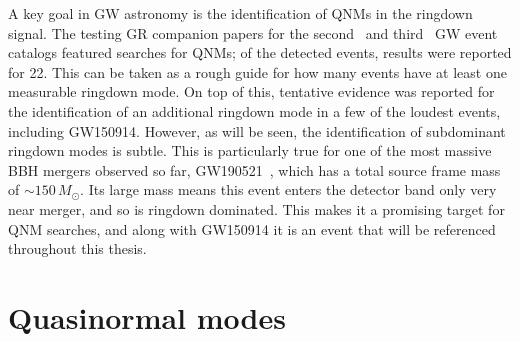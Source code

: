 A key goal in GW astronomy is the identification of QNMs in the ringdown signal.
The testing GR companion papers for the second~\cite{LIGOScientific:2020tif} and third~\cite{LIGOScientific:2021sio} GW event catalogs featured searches for QNMs; of the detected events, results were reported for 22.
This can be taken as a rough guide for how many events have at least one measurable ringdown mode.
On top of this, tentative evidence was reported for the identification of an additional ringdown mode in a few of the loudest events, including GW150914.
However, as will be seen, the identification of subdominant ringdown modes is subtle.
This is particularly true for one of the most massive BBH mergers observed so far, GW190521~\cite{LIGOScientific:2020iuh}, which has a total source frame mass of $\sim 150\,M_\odot$.
Its large mass means this event enters the detector band only very near merger, and so is ringdown dominated.
This makes it a promising target for QNM searches, and along with GW150914 it is an event that will be referenced throughout this thesis. 



\section{Quasinormal modes}
\label{ch1:sec:qnms}



